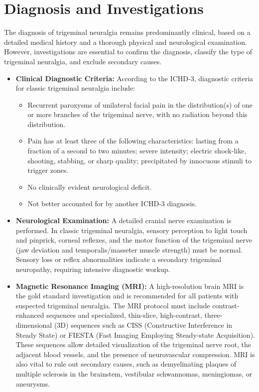 \section*{Diagnosis and Investigations}
The diagnosis of trigeminal neuralgia remains predominantly clinical, based on a detailed medical history and a thorough physical and neurological examination. However, investigations are essential to confirm the diagnosis, classify the type of trigeminal neuralgia, and exclude secondary causes.
\begin{itemize}
  \item \textbf{Clinical Diagnostic Criteria:} According to the ICHD-3, diagnostic criteria for classic trigeminal neuralgia include:
  \begin{itemize}
    \item Recurrent paroxysms of unilateral facial pain in the distribution(s) of one or more branches of the trigeminal nerve, with no radiation beyond this distribution.
    \item Pain has at least three of the following characteristics: lasting from a fraction of a second to two minutes; severe intensity; electric shock-like, shooting, stabbing, or sharp quality; precipitated by innocuous stimuli to trigger zones.
    \item No clinically evident neurological deficit.
    \item Not better accounted for by another ICHD-3 diagnosis.
  \end{itemize}
  \item \textbf{Neurological Examination:} A detailed cranial nerve examination is performed. In classic trigeminal neuralgia, sensory perception to light touch and pinprick, corneal reflexes, and the motor function of the trigeminal nerve (jaw deviation and temporalis/masseter muscle strength) must be normal. Sensory loss or reflex abnormalities indicate a secondary trigeminal neuropathy, requiring intensive diagnostic workup.
  \item \textbf{Magnetic Resonance Imaging (MRI):} A high-resolution brain MRI is the gold standard investigation and is recommended for all patients with suspected trigeminal neuralgia. The MRI protocol must include contrast-enhanced sequences and specialized, thin-slice, high-contrast, three-dimensional (3D) sequences such as CISS (Constructive Interference in Steady State) or FIESTA (Fast Imaging Employing Steady-state Acquisition). These sequences allow detailed visualization of the trigeminal nerve root, the adjacent blood vessels, and the presence of neurovascular compression. MRI is also vital to rule out secondary causes, such as demyelinating plaques of multiple sclerosis in the brainstem, vestibular schwannomas, meningiomas, or aneurysms.

\end{itemize}
